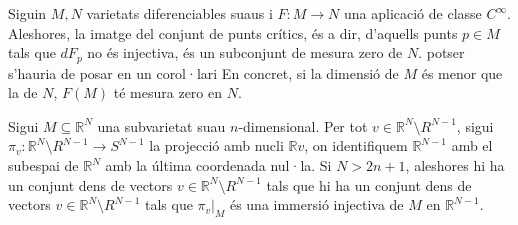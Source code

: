 \begin{teo}
    Siguin $M, N$ varietats diferenciables suaus i $F:M\to N$ una aplicació de classe $C^\infty$. Aleshores, la imatge del conjunt de punts crítics, és a dir, d'aquells punts $p\in M$ tals que $dF_p$ no és injectiva, és un subconjunt de mesura zero de $N$. {\color{blue} potser s'hauria de posar en un corol·lari} En concret, si la dimensió de $M$ és menor que la de $N$, $F(M)$ té mesura zero en $N$.
\end{teo}

\begin{lema}
    Sigui $M\subseteq\mathbb R^N$ una subvarietat suau $n$-dimensional. Per tot $v\in \mathbb R^N\setminus R^{N-1}$, sigui $\pi_v : \mathbb R^N\setminus R^{N-1}\to S^{N-1}$ la projecció amb nucli $\mathbb Rv$, on identifiquem $\mathbb R^{N-1}$ amb el subespai de $\mathbb R^N$ amb la última coordenada nul·la. Si $N>2n+1$, aleshores hi ha un conjunt dens de vectors $v\in \mathbb R^N\setminus R^{N-1}$ tals que hi ha un conjunt dens de vectors $v\in \mathbb R^N\setminus R^{N-1}$ tals que $\pi_v|_M$ és una immersió injectiva de $M$ en $\mathbb R^{N-1}$.
\end{lema}
